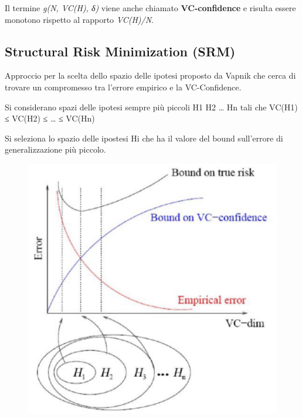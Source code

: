 Il termine \emph{g(N, VC(H), δ)} viene anche chiamato
\textbf{VC-confidence} e risulta essere monotono rispetto al rapporto
\emph{VC(H)/N}.

\subsection{Structural Risk Minimization
(SRM)}\label{structural-risk-minimization-srm}

Approccio per la scelta dello spazio delle ipotesi proposto da Vapnik
che cerca di trovare un compromesso tra l'errore empirico e la
VC-Confidence.

Si considerano spazi delle ipotesi sempre più piccoli H1  H2  \ldots{}
 Hn tali che VC(H1) ≤ VC(H2) ≤ \ldots{} ≤ VC(Hn)

Si seleziona lo spazio delle ipostesi Hi che ha il valore del bound
sull'errore di generalizzazione più piccolo.

\begin{figure}[htbp]
\centering
\includegraphics{./notes/immagini/l5-srm.png}
\caption{}
\end{figure}
